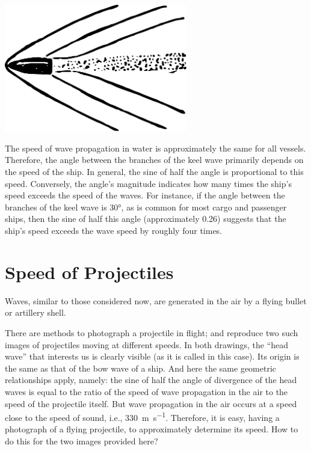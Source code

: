 \begin{marginfigure}[-3cm]%
\centering
\includegraphics[width=0.6\textwidth]{figures/ch-02/fig-051.pdf}
\end{marginfigure}


The speed of wave propagation in water is approximately the same for all vessels. Therefore, the angle between the branches of the keel wave primarily depends on the speed of the ship. In general, the sine of half the angle is proportional to this speed. Conversely, the angle's magnitude indicates how many times the ship's speed exceeds the speed of the waves. For instance, if the angle between the branches of the keel wave is \ang{30}, as is common for most cargo and passenger ships, then the sine of half this angle (approximately 0.26) suggests that the ship's speed exceeds the wave speed by roughly four times.

\section{Speed of Projectiles}
\label{sec-2.14}

\ques Waves, similar to those considered now, are generated in the air by a flying bullet or artillery shell.

There are methods to photograph a projectile in flight;  and  reproduce two such images of projectiles moving at different speeds. In both drawings, the ``head wave'' that interests us is clearly visible (as it is called in this case). Its origin is the same as that of the bow wave of a ship. And here the same geometric relationships apply, namely: the sine of half the angle of divergence of the head waves is equal to the ratio of the speed of wave propagation in the air to the speed of the projectile itself. But wave propagation in the air occurs at a speed close to the speed of sound, i.e., \SI{330}{\meter\per\second}. Therefore, it is easy, having a photograph of a flying projectile, to approximately determine its speed. How to do this for the two images provided here?

